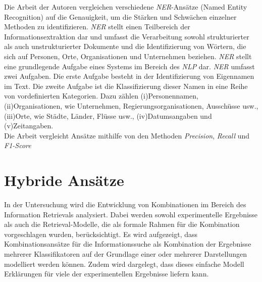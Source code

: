 Die Arbeit \cite{mansouri2008named} der Autoren \citeauthor{mansouri2008named} vergleichen verschiedene \emph{NER}-Ansätze (Named Entity Recognition) auf die Genauigkeit, um die Stärken und Schwächen einzelner Methoden zu identifizieren. \emph{NER} stellt einen Teilbereich der Informationsextraktion dar und umfasst die Verarbeitung sowohl strukturierter als auch unstrukturierter Dokumente und die Identifizierung von Wörtern, die sich auf Personen, Orte, Organisationen und Unternehmen beziehen. \emph{NER} stellt eine grundlegende Aufgabe eines Systems im Bereich des \emph{NLP} dar. \emph{NER} umfasst zwei Aufgaben. Die erste Aufgabe besteht in der Identifizierung von Eigennamen im Text. Die zweite Aufgabe ist die Klassifizierung dieser Namen in eine Reihe von vordefinierten Kategorien. Dazu zählen (i)Personennamen, (ii)Organisationen, wie Unternehmen, Regierungsorganisationen, Ausschüsse usw., (iii)Orte, wie Städte, Länder, Flüsse usw., (iv)Datumsangaben und (v)Zeitangaben.\\
Die Arbeit vergleicht Ansätze mithilfe von den Methoden \emph{Precision}, \emph{Recall} und \emph{F1-Score}
\section{Hybride Ansätze}
In der Untersuchung \cite{croft2000combining} wird die Entwicklung von Kombinationen im Bereich des Information Retrievals analysiert. Dabei werden sowohl experimentelle Ergebnisse als auch die Retrieval-Modelle, die als formale Rahmen für die Kombination vorgeschlagen wurden, berücksichtigt. Es wird aufgezeigt, dass Kombinationsansätze für die Informationssuche als Kombination der Ergebnisse mehrerer Klassifikatoren auf der Grundlage einer oder mehrerer Darstellungen modelliert werden können. Zudem wird dargelegt, dass dieses einfache Modell Erklärungen für viele der experimentellen Ergebnisse liefern kann.\\

